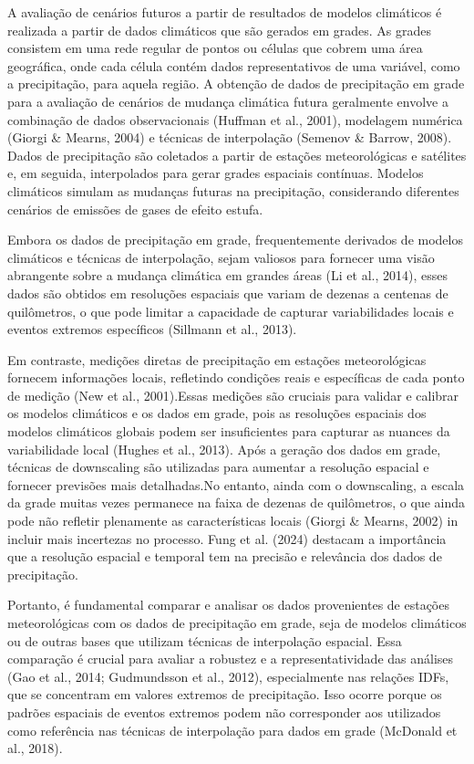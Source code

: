 \documentclass[
]{agujournal2019}
\begin{document}
A avaliação de cenários futuros a partir de resultados de modelos
climáticos é realizada a partir de dados climáticos que são gerados em
grades. As grades consistem em uma rede regular de pontos ou células que
cobrem uma área geográfica, onde cada célula contém dados
representativos de uma variável, como a precipitação, para aquela
região. A obtenção de dados de precipitação em grade para a avaliação de
cenários de mudança climática futura geralmente envolve a combinação de
dados observacionais (Huffman et al., 2001), modelagem numérica (Giorgi
\& Mearns, 2004) e técnicas de interpolação (Semenov \& Barrow, 2008).
Dados de precipitação são coletados a partir de estações meteorológicas
e satélites e, em seguida, interpolados para gerar grades espaciais
contínuas. Modelos climáticos simulam as mudanças futuras na
precipitação, considerando diferentes cenários de emissões de gases de
efeito estufa.

Embora os dados de precipitação em grade, frequentemente derivados de
modelos climáticos e técnicas de interpolação, sejam valiosos para
fornecer uma visão abrangente sobre a mudança climática em grandes áreas
(Li et al., 2014), esses dados são obtidos em resoluções espaciais que
variam de dezenas a centenas de quilômetros, o que pode limitar a
capacidade de capturar variabilidades locais e eventos extremos
específicos (Sillmann et al., 2013).

Em contraste, medições diretas de precipitação em estações
meteorológicas fornecem informações locais, refletindo condições reais e
específicas de cada ponto de medição (New et al., 2001).Essas medições
são cruciais para validar e calibrar os modelos climáticos e os dados em
grade, pois as resoluções espaciais dos modelos climáticos globais podem
ser insuficientes para capturar as nuances da variabilidade local
(Hughes et al., 2013). Após a geração dos dados em grade, técnicas de
downscaling são utilizadas para aumentar a resolução espacial e fornecer
previsões mais detalhadas.No entanto, ainda com o downscaling, a escala
da grade muitas vezes permanece na faixa de dezenas de quilômetros, o
que ainda pode não refletir plenamente as características locais (Giorgi
\& Mearns, 2002) in incluir mais incertezas no processo. Fung et al.
(2024) destacam a importância que a resolução espacial e temporal tem na
precisão e relevância dos dados de precipitação.

Portanto, é fundamental comparar e analisar os dados provenientes de
estações meteorológicas com os dados de precipitação em grade, seja de
modelos climáticos ou de outras bases que utilizam técnicas de
interpolação espacial. Essa comparação é crucial para avaliar a robustez
e a representatividade das análises (Gao et al., 2014; Gudmundsson et
al., 2012), especialmente nas relações IDFs, que se concentram em
valores extremos de precipitação. Isso ocorre porque os padrões
espaciais de eventos extremos podem não corresponder aos utilizados como
referência nas técnicas de interpolação para dados em grade (McDonald et
al., 2018).
\end{document}
